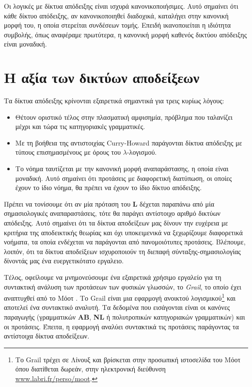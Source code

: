 \documentclass [a4paper,11pt] {book}
\theoremstyle{definition}
\theoremstyle{definition}
\newenvironment{note}[1][Σημείωση]{\begin{trivlist}
\item[\hskip \labelsep {\bfseries #1}]}{\end{trivlist}}
\begin{document}
\begin{note}
Οι λογικές με δίκτυα απόδειξης είναι ισχυρά κανονικοποιήσιμες. Αυτό σημαίνει ότι κάθε δίκτυο απόδειξης, αν κανονικοποιηθεί διαδοχικά, καταλήγει στην κανονική μορφή του, η οποία στερείται συνδέσεων τομής. Επειδή ικανοποιείται η ιδιότητα συμβολής, όπως αναφέραμε πρωτύτερα, η κανονική μορφή καθενός δικτύου απόδειξης είναι μοναδική.
\end{note}
\section*{Η αξία των δικτύων αποδείξεων}
Τα δίκτυα απόδειξης κρίνονται εξαιρετικά σημαντικά για τρεις κυρίως λόγους:
\begin{itemize}
\item Θέτουν οριστικό τέλος στην πλασματική αμφισημία, πρόβλημα που ταλανίζει μέχρι και τώρα τις κατηγοριακές γραμματικές.
\item Με τη βοήθεια της αντιστοιχίας Curry-Howard παράγονται δίκτυα απόδειξης με τύπους επισημασμένους με όρους του $\lambda$-λογισμού.
\item Το νόημα ταυτίζεται με την κανονική μορφή αναπαράστασης, η οποία είναι μοναδική. Αυτό σημαίνει ότι προτάσεις με διαφορετική διατύπωση, οι οποίες έχουν το ίδιο νόημα, θα πρέπει να έχουν το ίδιο δίκτυο απόδειξης.
\end{itemize}
Πρέπει να τονίσουμε ότι αν μία πρόταση του \textbf{L} δέχεται παραπάνω από μία σημασιολογικές αναπαραστάσεις, τότε θα παράγει αντίστοιχο αριθμό δικτύων απόδειξης. Αυτό σημαίνει ότι τα δίκτυα αποδείξεων μας δίνουν την ευχέρεια με κριτήρια της αποδεικτικής θεωρίας και όχι υποκειμενικά να ξεχωρίζουμε διαφορετικά νοήματα, τα οποία ενδέχεται να παράγονται από πανομοιότυπες προτάσεις. Βλέπουμε, λοιπόν, ότι τα δίκτυα αποδείξεων ισχυροποιούν τη διεπαφή σύνταξης-σημασιολογίας δίνοντάς μας ένα ευεργετικότατο εργαλειο.

Τέλος, οφείλουμε να μνημονεύσουμε ένα εξαιρετικά χρήσιμο εργαλείο για τη συντακτική ανάλυση των προτάσεων των φυσικών γλωσσών, το \textit{Grail}, το οποίο έχει αναπτυχθεί από το Μόοτ \citep{Moot99grail:an}. Το Grail είναι μια εφαρμογή ανοικτού λογισμικού\footnote{Το Grail τρέχει σε Λίνουξ και βρίσκεται στην προσωπική ιστοσελίδα του Μόοτ όπου διατίθεται δωρεάν, στην ηλεκτρονική διεύθυνση \href{http://www.labri.fr/perso/moot}{www.labri.fr/perso/moot}.} και αποτελεί ένα συντακτικό αναλυτή. Τα δεδομένα που εισάγονται είναι οι κανόνες παραγωγής (γραμματικών \textbf{ΑΒ}, \textbf{NL} ή πολυτροπικών κατηγοριακών γραμματικών) και οι προτάσεις. Έπειτα, η εφαρμογή αναλύει συντακτικά τις προτάσεις παράγοντας τα αντίστοιχα δίκτυα αποδείξεων.
\end{document}
